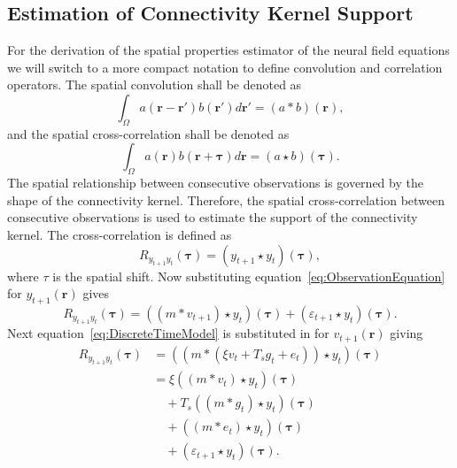 \documentclass[conference,onecolumn]{IEEEtran}
\begin{document}
\subsection{Estimation of Connectivity Kernel Support}
For the derivation of the spatial properties estimator of the neural field equations we will switch to a more compact notation to define convolution and correlation operators. The spatial convolution shall be denoted as
\begin{equation}
	\int_\Omega a(\mathbf{r}-\mathbf{r}')b(\mathbf{r}')d\mathbf{r}' = (a\ast b)(\mathbf{r}),
\end{equation}
and the spatial cross-correlation shall be denoted as 
\begin{equation}
	\int_\Omega a(\mathbf{r})b(\mathbf{r}+\boldsymbol{\tau})d\mathbf{r} = (a\star b)(\boldsymbol{\tau}).
\end{equation} 
The spatial relationship between consecutive observations is governed by the shape of the connectivity kernel. Therefore, the spatial cross-correlation between consecutive observations is used to estimate the support of the connectivity kernel. The cross-correlation is defined as
\begin{equation}
	R_{y_{t+1}y_t}(\boldsymbol{\tau}) = \left(y_{t+1}\star y_t\right)\left(\boldsymbol{\tau}\right),
\end{equation}
where $\tau$ is the spatial shift. Now substituting equation~\ref{eq:ObservationEquation} for $y_{t+1}(\mathbf{r})$ gives 
\begin{equation}
	R_{y_{t+1}y_t}\left(\boldsymbol{\tau}\right) = \left(\left(m \ast v_{t+1}\right)\star y_t\right)\left(\boldsymbol{\tau}\right) + \left(\varepsilon_{t+1} \star y_t\right)\left(\boldsymbol{\tau}\right).
\end{equation}
Next equation~\ref{eq:DiscreteTimeModel} is substituted in for $v_{t+1}(\mathbf{r})$ giving 
\begin{align}
	R_{y_{t+1}y_t}(\boldsymbol{\tau}) &= (\left(m \ast \left(\xi v_t +  T_s g_t + e_t\right)\right) \star y_t)(\boldsymbol{\tau})\\
	&= \xi\left(\left(m \ast v_t\right) \star y_t \right)(\boldsymbol{\tau}) \nonumber\\
	&\quad+ T_s \left(\left(m\ast g_t\right)\star y_t \right)(\boldsymbol{\tau}) \nonumber\\
	&\quad+ \left(\left(m\ast e_t\right)\star y_t \right)(\boldsymbol{\tau}) \nonumber\\
	&\quad+ (\varepsilon_{t+1} \star y_t)(\boldsymbol{\tau}).
\end{align}
\end{document}
